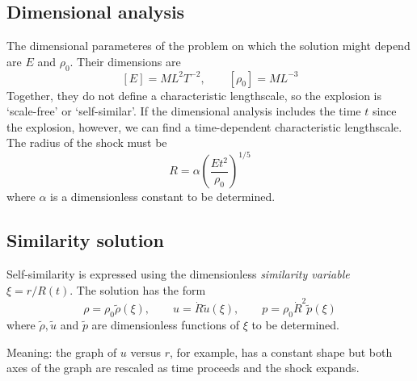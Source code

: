 \documentclass{jknotes}
\begin{document}
\subsection{Dimensional analysis}
The dimensional parameteres of the problem on which the solution might depend
are $E$ and $\rho_0$. Their dimensions are
\begin{equation}
	\left[E\right] = M L^2 T^{-2}, \hspace{2em} \left[ \rho_0\right] = M
	L^{-3}
\end{equation}
Together, they do not define a characteristic lengthscale, so the explosion is
`scale-free' or `self-similar'. If the dimensional analysis includes the time
$t$ since the explosion, however, we can find a time-dependent characteristic
lengthscale. The radius of the shock must be
\begin{equation}
	R = \alpha \left( \frac{E t^2}{\rho_0}\right)^{1/5}
\end{equation}
where $\alpha$ is a dimensionless constant to be determined.

\subsection{Similarity solution}
Self-similarity is expressed using the dimensionless \emph{similarity
variable} $\xi = r/R(t)$.  The solution has the form
\begin{equation}
	\rho = \rho_0 \tilde{\rho}(\xi), \hspace{2em} u = \dot{R} \tilde{u}(\xi),
	\hspace{2em} p = \rho_0 \dot{R}^2 \tilde{p}(\xi)
\end{equation}
where $\tilde{\rho}, \tilde{u}$ and $\tilde{p}$ are dimensionless functions of
$\xi$ to be determined. 

Meaning: the graph of $u$ versus $r$, for example, has a constant shape but
both axes of the graph are rescaled as time proceeds and the shock expands.
\end{document}
